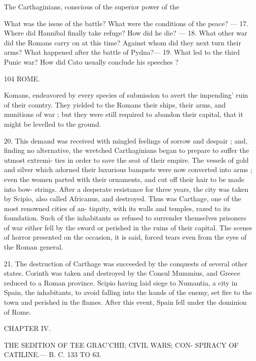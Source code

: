 \documentclass[openany,a4paper]{memoir}
\begin{document}
The Carthaginians, conscious of the superior power of the 

What was the issue of the battle? What were the conditions of 
the peace? — 17. Where did Hannibal finally take refuge? How did 
he die? — 18. What other war did the Romans carry on at this time? 
Against whom did they next turn their arms? What happened after 
the battle of Pydna?— 19. What led to the third Punic war? How 
did Cato usually conclude his speeches ? 



104 ROME. 

Komans, endeavored by every species of submission to avert 
the impending' ruin of their country. They yielded to the 
Romans their ships, their arms, and munitions of war ; but 
they were still required to abandon their capital, that it 
might be levelled to the ground. 

20. This demand was received with mingled feelings of 
sorrow and despair ; and, finding no alternative, the wretched 
Carthaginians began to prepare to suffer the utmost extremi- 
ties in order to save the seat of their empire. The vessels 
of gold and silver which adorned their luxurious banquets 
were now converted into arms ; even the women parted with 
their ornaments, and cut off their hair to be made into bow- 
strings. After a desperate resistance for three years, the 
city was taken by Scipio, also called Africanus, and destroyed. 
Thus was Carthage, one of the most renowned cities of an- 
tiquity, with its walls and temples, razed to its foundation. 
Such of the inhabitants as refused to surrender themselves 
prisoners of war either fell by the sword or perished in the 
ruins of their capital. The scenes of horror presented on the 
occasion, it is said, forced tears even from the eyes of the 
Roman general. 

21. The destruction of Carthage was succeeded by the 
conquests of several other states. Corinth was taken and 
destroyed by the Consul Mummius, and Greece reduced to a 
Roman province. Scipio having laid siege to Numantia, a 
city in Spain, the inhabitants, to avoid falling into the hands 
of the enemy, set fire to the town and perished in the flames. 
After this event, Spain fell under the dominion of Rome. 



CHAPTER IV. 



THE SEDITION OF TEE GRAC'CHII; CIVIL WARS; CON- 
SPIRACY OF CATILINE.— B. C. 133 TO 63. 
\end{document}
